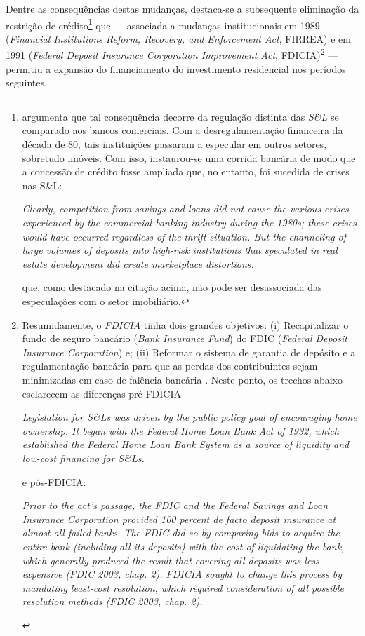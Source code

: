 Dentre as consequências destas mudanças, destaca-se a subsequente eliminação da restrição de crédito\footnote{\textcite{federal_deposit_insurance_corporation_savings_1997} argumenta que tal consequência decorre da regulação distinta das \textit{S\&L} se comparado aos bancos comerciais. Com a desregulamentação financeira da década de 80, tais instituições passaram a especular em outros setores, sobretudo imóveis. Com isso, instaurou-se uma corrida bancária de modo que a concessão de crédito fosse ampliada que, no entanto, foi sucedida de crises nas S\&L:
	
	\begin{citacao}
		\textit{Clearly, competition from savings and loans did not cause the various crises experienced by the commercial banking industry during the 1980s; these crises would have occurred regardless of the thrift situation. But the channeling of large volumes of deposits into high-risk institutions that speculated in real estate development did create marketplace distortions.} \cite[p.~168]{federal_deposit_insurance_corporation_savings_1997}
	\end{citacao}
que, como destacado na citação acima, não pode ser desassociada das especulações com o setor imobiliário.
} que --- associada a mudanças institucionais em 1989 (\textit{Financial Institutions Reform, Recovery, and Enforcement Act}, FIRREA) e em 1991 (\textit{Federal Deposit Insurance Corporation Improvement
Act}, FDICIA)\footnote{
Resumidamente, o \textit{FDICIA} tinha dois grandes objetivos: (i) Recapitalizar o fundo de seguro bancário (\textit{Bank Insurance Fund}) do FDIC (\textit{Federal Deposit Insurance Corporation}) e; (ii) Reformar o sistema de garantia de depósito e a regulamentação bancária para que as perdas dos contribuintes sejam minimizadas em caso de falência bancária \cite{mishkin_evaluating_1997}.
Neste ponto, os trechos abaixo esclarecem as diferenças pré-FDICIA

\begin{citacao}
	\textit{		Legislation for S\&Ls was driven by the public policy goal of encouraging home ownership. It began with the Federal Home Loan Bank Act of 1932, which established the Federal Home Loan Bank System as a source of liquidity and low-cost financing for S\&Ls.} \cite[p.~170]{federal_deposit_insurance_corporation_savings_1997}
\end{citacao}
e pós-FDICIA:

\begin{citacao}
	\textit{Prior to the act’s passage, the FDIC and the Federal Savings and Loan Insurance Corporation provided 100 percent de facto deposit insurance at almost all failed banks. The FDIC did so by comparing bids to acquire the entire bank (including all its deposits) with the cost of liquidating the bank, which generally produced the result that covering all deposits was less expensive (FDIC 2003, chap. 2). FDICIA sought to change this process by mandating least-cost resolution, which required consideration of all possible resolution methods (FDIC 2003, chap. 2).} \cite[p.~iii]{wall_too_2010}
\end{citacao}

}  --- permitiu a expansão do financiamento do investimento residencial nos períodos seguintes.


